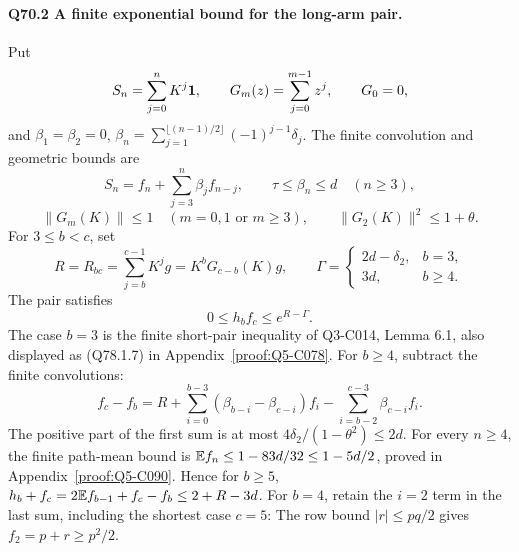 \paragraph{Q70.2 A finite exponential bound for the long-arm pair.}
Put
\[
S_n=\sum_{j=0}^nK^j\mathbf1,\qquad
G_m(z)=\sum_{j=0}^{m-1}z^j,\qquad G_0=0,
\]
and
\(\beta_1=\allowbreak \beta_2=\allowbreak 0\),
\(\beta_n=\allowbreak \sum_{j=\allowbreak 1}^{\lfloor(n-1)/2\rfloor}(-1)^{j-1}\delta_j\).
The finite convolution and geometric bounds are
\begin{equation}\tag{Q70.2.1}\label{eq:Q70:2.1}
S_n=f_n+\sum_{j=3}^n\beta_jf_{n-j},\qquad
\tau\le\beta_n\le d\quad(n\ge3),
\end{equation}
\begin{equation}\tag{Q70.2.2}\label{eq:Q70:2.2}
\|G_m(K)\|\le1\quad(m=0,1\text{ or }m\ge3),\qquad
\|G_2(K)\|^2\le1+\theta.
\end{equation}
For \(3\le\allowbreak  b<\allowbreak c\), set
\begin{equation}\tag{Q70.2.3}\label{eq:Q70:2.3}
R=R_{bc}=\sum_{j=b}^{c-1}K^jg=K^bG_{c-b}(K)g,\qquad
\Gamma=\begin{cases}2d-\delta_2,&b=3,\\3d,&b\ge4.\end{cases}
\end{equation}
The pair satisfies
\begin{equation}\tag{Q70.2.4}\label{eq:Q70:2.4}
0\le h_bf_c\le e^{R-\Gamma}.
\end{equation}
The case \(b=\allowbreak 3\) is the finite short-pair inequality of Q3-C014,
Lemma 6.1, also displayed as (Q78.1.7) in
Appendix~\ref{proof:Q5-C078}.
For \(b\ge\allowbreak 4\), subtract the finite convolutions:
\begin{equation}\tag{Q70.2.5}\label{eq:Q70:2.5}
f_c-f_b=R+
\sum_{i=0}^{b-3}(\beta_{b-i}-\beta_{c-i})f_i
-\sum_{i=b-2}^{c-3}\beta_{c-i}f_i.
\end{equation}
The positive part of the first sum is at most
\(4\delta_2/(1-\theta^2)\le\allowbreak 2d\).
For every \(n\ge\allowbreak 4\), the finite path-mean bound is
\(\mathbb E f_n\le\allowbreak 1-83d/32\le\allowbreak 1-5d/2\), proved in
Appendix~\ref{proof:Q5-C090}. Hence for \(b\ge\allowbreak 5\),
\(h_b+f_c=\allowbreak 2\mathbb E f_{b-1}+f_c-f_b\le\allowbreak 2+R-3d\).
For \(b=\allowbreak 4\), retain the \(i=\allowbreak 2\) term in the last sum, including
the shortest case \(c=\allowbreak 5\):
The row bound \(|r|\le\allowbreak  pq/2\) gives \(f_2=\allowbreak p+r\ge\allowbreak  p^2/2\).
